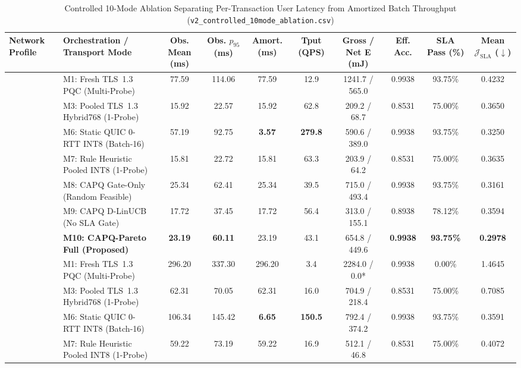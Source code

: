 \documentclass[10pt,journal,compsoc]{IEEEtran}
\begin{document}
\begin{table}[!t]
\centering
\caption{Controlled 10-Mode Ablation Separating Per-Transaction User Latency from Amortized Batch Throughput (\texttt{v2\_controlled\_10mode\_ablation.csv})}
\label{tab:ablation}
\setlength{\tabcolsep}{4.3pt}
\begin{tabular}{@{}llcccccccc@{}}
\toprule
Network Profile & Orchestration / Transport Mode & Obs. Mean (ms) & Obs. $p_{95}$ (ms) & Amort. (ms) & Tput (QPS) & Gross / Net E (mJ) & Eff. Acc. & SLA Pass (\%) & Mean $\mathcal{J}_{\mathrm{SLA}}$ ($\downarrow$) \\
\midrule
{}
 & M1: Fresh TLS~1.3 PQC (Multi-Probe)      & 77.59 & 114.06 & 77.59 & 12.9  & 1241.7 / 565.0 & 0.9938 & 93.75\% & 0.4232 \\
 & M3: Pooled TLS~1.3 Hybrid768 (1-Probe)   & 15.92 & 22.57  & 15.92 & 62.8  & 209.2 / 68.7   & 0.8531 & 75.00\% & 0.3650 \\
 & M6: Static QUIC 0-RTT INT8 (Batch-16)    & 57.19 & 92.75  & \textbf{3.57} & \textbf{279.8} & 590.6 / 389.0  & 0.9938 & 93.75\% & 0.3250 \\
 & M7: Rule Heuristic Pooled INT8 (1-Probe) & 15.81 & 22.72  & 15.81 & 63.3  & 203.9 / 64.2   & 0.8531 & 75.00\% & 0.3635 \\
 & M8: CAPQ Gate-Only (Random Feasible)     & 25.34 & 62.41  & 25.34 & 39.5  & 715.0 / 493.4  & 0.9938 & 93.75\% & 0.3161 \\
 & M9: CAPQ D-LinUCB (No SLA Gate)          & 17.72 & 37.45  & 17.72 & 56.4  & 313.0 / 155.1  & 0.8938 & 78.12\% & 0.3594 \\
 & \textbf{M10: CAPQ-Pareto Full (Proposed)}& \textbf{23.19} & \textbf{60.11} & 23.19 & 43.1 & 654.8 / 449.6  & \textbf{0.9938} & \textbf{93.75\%} & \textbf{0.2978} \\
\midrule
{}
 & M1: Fresh TLS~1.3 PQC (Multi-Probe)      & 296.20& 337.30 & 296.20& 3.4   & 2284.0 / 0.0*  & 0.9938 & 0.00\%  & 1.4645 \\
 & M3: Pooled TLS~1.3 Hybrid768 (1-Probe)   & 62.31 & 70.05  & 62.31 & 16.0  & 704.9 / 218.4  & 0.8531 & 75.00\% & 0.7085 \\
 & M6: Static QUIC 0-RTT INT8 (Batch-16)    & 106.34& 145.42 & \textbf{6.65} & \textbf{150.5} & 792.4 / 374.2  & 0.9938 & 93.75\% & 0.3591 \\
 & M7: Rule Heuristic Pooled INT8 (1-Probe) & 59.22 & 73.19  & 59.22 & 16.9  & 512.1 / 46.8   & 0.8531 & 75.00\% & 0.4072 \\

\end{tabular}
\end{table}
\end{document}
